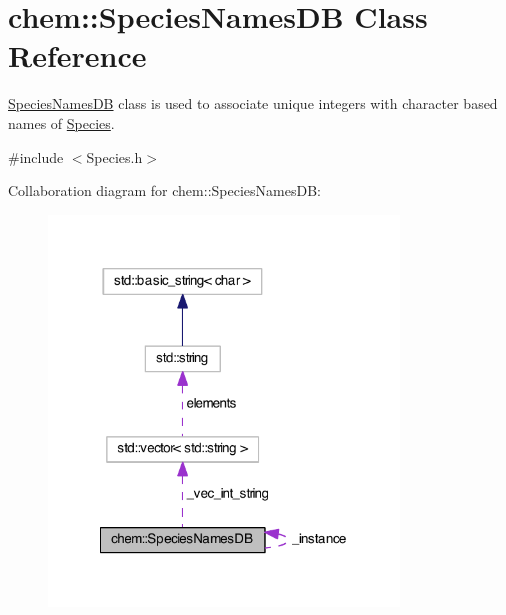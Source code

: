 \hypertarget{classchem_1_1SpeciesNamesDB}{\section{chem\-:\-:Species\-Names\-D\-B Class Reference}
\label{classchem_1_1SpeciesNamesDB}
}


\hyperlink{classchem_1_1SpeciesNamesDB}{Species\-Names\-D\-B} class is used to associate unique integers with character based names of \hyperlink{classchem_1_1Species}{Species}.  




{\ttfamily \#include $<$Species.\-h$>$}



Collaboration diagram for chem\-:\-:Species\-Names\-D\-B\-:\nopagebreak
\begin{figure}[H]
\begin{center}
\leavevmode
\includegraphics[width=264pt]{classchem_1_1SpeciesNamesDB__coll__graph}
\end{center}
\end{figure}

